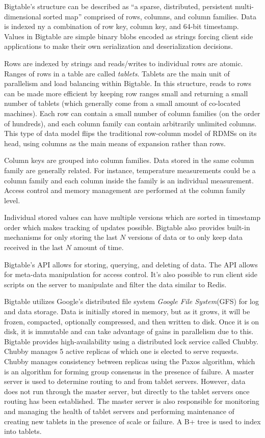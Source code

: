 \documentclass[]{article}
\begin{document}
Bigtable's structure can be described as ``a sparse, distributed, persistent multi-dimensional sorted map'' comprised of rows, columns, and column families. Data is indexed ny a combination of row key, column key, and 64-bit timestamp. Values in Bigtable are simple binary blobs encoded as strings forcing client side applications to make their own serialization and deserialization decisions. 

Rows are indexed by strings and reads/writes to individual rows are atomic. Ranges of rows in a table are called \textit{tablets}. Tablets are the main unit of parallelism and load balancing within Bigtable. In this structure, reads to rows can be made more efficient by keeping row ranges small and returning a small number of tablets (which generally come from a small amount of co-located machines). Each row can contain a small number of column families (on the order of hundreds), and each column family can contain arbitrarily unlimited columns. This type of data model flips the traditional row-column model of RDMSs on its head, using columns as the main means of expansion rather than rows.

Column keys are grouped into column families. Data stored in the same column family are generally related. For instance, temperature measurements could be a column family and each column inside the family is an individual measurement. Access control and memory management are performed at the column family level.

Individual stored values can have multiple versions which are sorted in timestamp order which makes tracking of updates possible. Bigtable also provides built-in mechanisms for only storing the last $N$ versions of data or to only keep data received in the last $N$ amount of time.

Bigtable's API allows for storing, querying, and deleting of data. The API allows for meta-data manipulation for access control. It's also possible to run client side scripts on the server to manipulate and filter the data similar to Redis.

Bigtable utilizes Google's distributed file system \textit{Google File System}(GFS) for log and data storage. Data is initially stored in memory, but as it grows, it will be frozen, compacted, optionally compressed, and then written to disk. Once it is on disk, it is immutable and can take advantage of gains in parallelism due to this. Bigtable provides high-availability using a distributed lock service called Chubby\cite{burrows2006chubby}. Chubby manages 5 active replicas of which one is elected to serve requests. Chubby manages consistency between replicas using the Paxos algorithm\cite{chandra2007paxos}, which is an algorithm for forming group consensus in the presence of failure. A master server is used to determine routing to and from tablet servers. However, data does not run through the master server, but directly to the tablet servers once routing has been established.  The master server is also responsible for monitoring and managing the health of tablet servers and performing maintenance of creating new tablets in the presence of scale or failure. A B+ tree is used to index into tablets.
\end{document}
